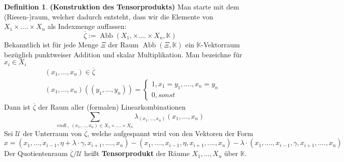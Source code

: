 \documentclass[12pt,a4paper]{article}
\theoremstyle{definition}
\newtheorem{definition}[theorem]{Definition}
\theoremstyle{remark}
\renewcommand{\bar}[1]{\overline{#1}}
\DeclareMathOperator{\Abb}{Abb}
\begin{document}
	\begin{definition}{\textbf{(Konstruktion des Tensorprodukts)}}
		Man starte mit dem (Riesen-)raum, welcher dadurch entsteht, dass wir die Elemente von $X_1 \times .... \times X_n$ als Indexmenge auffassen:
		\begin{equation}
			\bar{\zeta}:= \Abb (X_1, \times .... \times X_n, \mathbb{K})
		\end{equation}
		Bekanntlich ist für jede Menge $\Xi$ der Raum $\Abb (\Xi, \mathbb{K})$ ein $\mathbb{K}$-Vektorraum bezüglich punktweiser Addition und skalar Multiplikation. Man bezeichne für $x_i \in X_i$
		\begin{equation}
			\begin{split}
				&(x_1,...,x_n) \in \bar{\zeta}  \\
				&(x_1,...,x_n) \left( (y_1,...,y_n) \right)= \begin{cases}
						1, x_1 = y_1,....,x_n= y_n \\
						0, sonst
					\end{cases}
			\end{split}
		\end{equation}
		Dann ist $\bar{\zeta}$ der Raum aller (formalen) Linearkombinationen
		\begin{equation}
			\sum_{endl., \ 
			(x_1,...,x_n) \in X_1 \times .... \times X_n} \lambda_{(x_1,...,x_n)} (x_1,...,x_n)
		\end{equation}
		Sei $\mathcal{U}$ der Unterraum von $\bar{\zeta}$, welche aufgespannt wird von den Vektoren der Form
		\begin{equation}
			x = (x_1,...,x_{i-1}, \eta + \lambda \cdot \gamma, x_{i+1},....,x_n)-(x_1,....,x_{i-1},\eta,x_{i+1},....,x_n) - \lambda \cdot (x_1,....,x_{i-1}, \gamma,x_{i+1},....,x_n)
		\end{equation}
		Der Quotientenraum $\bar{\zeta}/\mathcal{U}$ heißt \textbf{Tensorprodukt} der Räume $X_1,...,X_n$ über $\mathbb{K}$.
	\end{definition}
\end{document}
